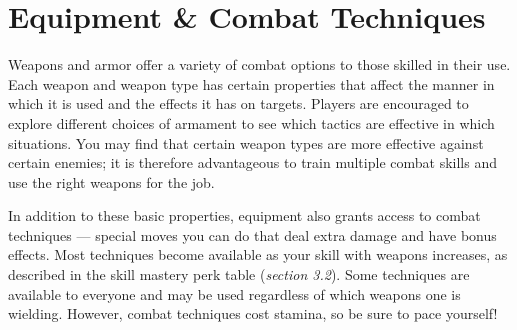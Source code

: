 \documentclass[12pt]{book}
\begin{document}
\chapter{Equipment \& Combat Techniques}

Weapons and armor offer a variety of combat options to those skilled in their use. Each weapon and weapon type has certain properties that affect the manner in which it is used and the effects it has on targets. Players are encouraged to explore different choices of armament to see which tactics are effective in which situations. You may find that certain weapon types are more effective against certain enemies; it is therefore advantageous to train multiple combat skills and use the right weapons for the job.

In addition to these basic properties, equipment also grants access to combat techniques --- special moves you can do that deal extra damage and have bonus effects. Most techniques become available as your skill with weapons increases, as described in the skill mastery perk table (\textit{section 3.2}). Some techniques are available to everyone and may be used regardless of which weapons one is wielding. However, combat techniques cost stamina, so be sure to pace yourself!
\end{document}
